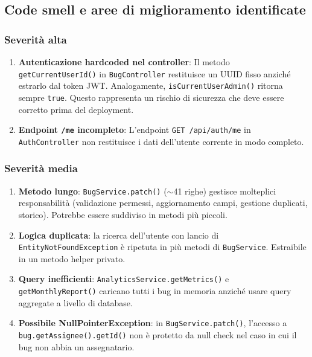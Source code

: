 \subsection{Code smell e aree di miglioramento identificate}

\subsubsection{Severità alta}

\begin{enumerate}
    \item \textbf{Autenticazione hardcoded nel controller}: Il metodo
    \texttt{getCurrentUserId()} in \texttt{BugController} restituisce un UUID
    fisso anziché estrarlo dal token JWT. Analogamente,
    \texttt{isCurrentUserAdmin()} ritorna sempre \texttt{true}.
    Questo rappresenta un rischio di sicurezza che deve essere corretto
    prima del deployment.

    \item \textbf{Endpoint \texttt{/me} incompleto}: L'endpoint
    \texttt{GET /api/auth/me} in \texttt{AuthController} non restituisce
    i dati dell'utente corrente in modo completo.
\end{enumerate}

\subsubsection{Severità media}

\begin{enumerate}
    \item \textbf{Metodo lungo}: \texttt{BugService.patch()} ($\sim$41 righe)
    gestisce molteplici responsabilità (validazione permessi, aggiornamento
    campi, gestione duplicati, storico). Potrebbe essere suddiviso in metodi
    più piccoli.

    \item \textbf{Logica duplicata}: la ricerca dell'utente con lancio di
    \texttt{EntityNotFoundException} è ripetuta in più metodi di
    \texttt{BugService}. Estraibile in un metodo helper privato.

    \item \textbf{Query inefficienti}: \texttt{AnalyticsService.getMetrics()}
    e \texttt{getMonthlyReport()} caricano tutti i bug in memoria anziché
    usare query aggregate a livello di database.

    \item \textbf{Possibile NullPointerException}: in \texttt{BugService.patch()},
    l'accesso a \texttt{bug.getAssignee().getId()} non è protetto da null check
    nel caso in cui il bug non abbia un assegnatario.
\end{enumerate}

